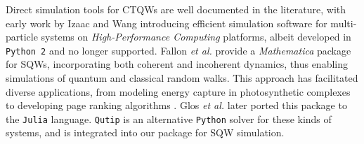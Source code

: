 \documentclass[../../main.tex]{subfiles}
\begin{document}


Direct simulation tools for CTQWs are well documented in the literature, with
early work by Izaac and Wang \cite{izaac2015} introducing efficient simulation
software for multi-particle systems on \textit{High-Performance Computing}
platforms, albeit developed in \texttt{Python 2} and no longer supported.
Fallon \textit{et al.} \cite{falloon2017a} provide a \textit{Mathematica}
package for SQWs, incorporating both coherent and incoherent dynamics, thus
enabling simulations of quantum and classical random walks. This approach has
facilitated diverse applications, from modeling energy capture in
photosynthetic complexes \cite{mohseni08} to developing page ranking algorithms
\cite{SanchezBurillo2012}. Glos \textit{et al.} \cite{glos2018}
later ported this package to the \texttt{Julia} language. \texttt{Qutip}
\cite{Johansson2011,Johansson2012} is an alternative \texttt{Python} solver for
these kinds of systems, and is integrated into our package for SQW simulation.
\end{document}
